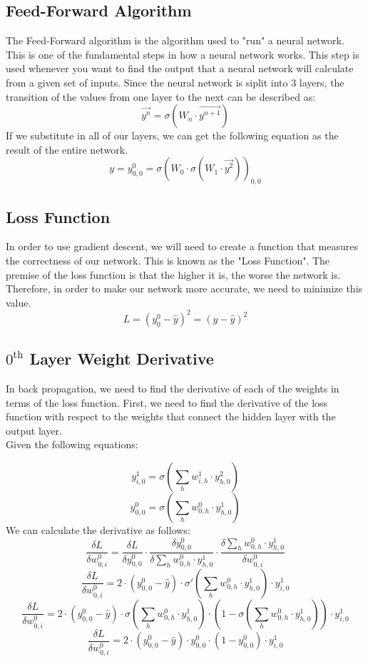 \documentclass[10pt]{article}
\begin{document}
\subsection{Feed-Forward Algorithm}
The Feed-Forward algorithm is the algorithm used to "run" a neural network. This is one of the fundamental steps in how a neural network works. This step is used whenever you want to find the output that a neural network will calculate from a given set of inputs. Since the neural network is siplit into 3 layers, the transition of the values from one layer to the next can be described as:
$$\vec{y^n} = \sigma(W_{n} \cdot \vec{y^{n+1}})$$
If we substitute in all of our layers, we can get the following equation as the result of the entire network.
$$y = y^0_{0,0} = \sigma(W_0 \cdot \sigma(W_1 \cdot \vec{y^2}))_{0,0}$$
\subsection{Loss Function}
In order to use gradient descent, we will need to create a function that measures the correctness of our network. This is known as the "Loss Function". The premise of the loss function is that the higher it is, the worse the network is. Therefore, in order to make our network more accurate, we need to minimize this value.
$$L = (y^0_0 - \hat{y})^2 = (y - \hat{y})^2$$

\subsection{$0^{\text{th}}$ Layer Weight Derivative}
In back propagation, we need to find the derivative of each of the weights in terms of the loss function. First, we need to find the derivative of the loss function with respect to the weights that connect the hidden layer with the output layer.\\
Given the following equations:

$$y^1_{i,0} = \sigma(\sum_h{w^1_{i,h} \cdot y^2_{h,0}})$$
$$y^0_{0,0} = \sigma(\sum_h{w^0_{0,h} \cdot y^1_{h,0}})$$
We can calculate the derivative as follows:
$$\frac{\delta L}{\delta w^0_{0,i}} = \frac{\delta L}{\delta y^0_{0,0}} \cdot \frac{\delta y^0_{0,0}}{\delta \sum_h{w^0_{0,h} \cdot y^1_{h,0}}} \cdot \frac{\delta \sum_h{w^0_{0,h} \cdot y^1_{h,0}}}{\delta w^0_{0,i}}$$
$$\frac{\delta L}{\delta w^0_{0,i}} = 2 \cdot (y^0_{0,0} - \hat{y}) \cdot \sigma'(\sum_h{w^0_{0,h} \cdot y^1_{h,0}}) \cdot y^1_{i,0}$$
$$\frac{\delta L}{\delta w^0_{0,i}} = 2 \cdot (y^0_{0,0} - \hat{y}) \cdot \sigma(\sum_h{w^0_{0,h} \cdot y^1_{h,0}}) \cdot (1 - \sigma(\sum_h{w^0_{0,h} \cdot y^1_{h,0}})) \cdot y^1_{i,0}$$
$$\frac{\delta L}{\delta w^0_{0,i}} = 2\cdot (y^0_{0,0} - \hat{y}) \cdot y^0_{0,0} \cdot (1 - y^0_{0,0}) \cdot y^1_{i,0}$$
\end{document}
